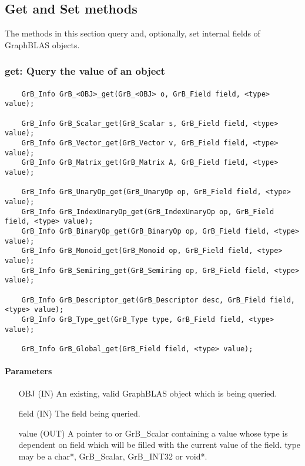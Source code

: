 \subsection{Get and Set methods}

The methods in this section query and, optionally, 
set internal fields of GraphBLAS objects.

\subsubsection{{\sf get}: Query the value of an object}

\paragraph{\syntax}

\begin{verbatim}
    GrB_Info GrB_<OBJ>_get(GrB_<OBJ> o, GrB_Field field, <type> value);

    GrB_Info GrB_Scalar_get(GrB_Scalar s, GrB_Field field, <type> value);
    GrB_Info GrB_Vector_get(GrB_Vector v, GrB_Field field, <type> value);
    GrB_Info GrB_Matrix_get(GrB_Matrix A, GrB_Field field, <type> value);

    GrB_Info GrB_UnaryOp_get(GrB_UnaryOp op, GrB_Field field, <type> value);
    GrB_Info GrB_IndexUnaryOp_get(GrB_IndexUnaryOp op, GrB_Field field, <type> value);
    GrB_Info GrB_BinaryOp_get(GrB_BinaryOp op, GrB_Field field, <type> value);
    GrB_Info GrB_Monoid_get(GrB_Monoid op, GrB_Field field, <type> value);
    GrB_Info GrB_Semiring_get(GrB_Semiring op, GrB_Field field, <type> value);

    GrB_Info GrB_Descriptor_get(GrB_Descriptor desc, GrB_Field field, <type> value);
    GrB_Info GrB_Type_get(GrB_Type type, GrB_Field field, <type> value);

    GrB_Info GrB_Global_get(GrB_Field field, <type> value);
\end{verbatim}

\paragraph{Parameters}

\begin{itemize}[leftmargin=1.1in]
    \item[{\sf OBJ}] ({\sf IN}) An existing, valid GraphBLAS object which is being queried.
    \item[{\sf field}] ({\sf IN}) The field being queried.
    \item[{\sf value}] ({\sf OUT}) A pointer to or {\sf GrB\_Scalar} containing a value whose type is dependent on {\sf field} which will be
                                 filled with the current value of the field. {\sf type} may be a {\sf char*},
                                 {\sf GrB\_Scalar}, {\sf GrB\_INT32} or {\sf void*}.
\end{itemize}


